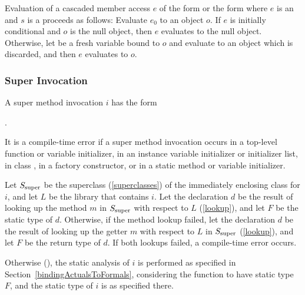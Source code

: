 \documentclass[makeidx]{article}
\begin{document}
{\LMHash{}%
Evaluation of a cascaded member access $e$
of the form  or the form 
where $e$ is an  and
$s$ is a 
proceeds as follows:
Evaluate $e_0$ to an object $o$.
If $e$ is initially conditional and $o$ is the null object,
then $e$ evaluates to the null object.
Otherwise, let  be a fresh variable bound to $o$ and
evaluate  to an object which is discarded, and
then $e$ evaluates to $o$.


\subsubsection{Super Invocation}


\LMHash{}%
A super method invocation $i$ has the form

.


\LMHash{}%
It is a compile-time error if a super method invocation occurs in a top-level function or variable initializer,
in an instance variable initializer or initializer list,
in class ,
in a factory constructor,
or in a static method or variable initializer.

{ %

\def\SuperClass{\ensuremath{S_{\mbox{\scriptsize{}super}}}}

\LMHash{}%
Let \SuperClass{} be the superclass (\ref{superclasses})
of the immediately enclosing class for $i$,
and let $L$ be the library that contains $i$.
Let the declaration $d$ be
the result of looking up the method $m$ in \SuperClass{}
with respect to $L$ (\ref{lookup}),
and let $F$ be the static type of $d$.
Otherwise, if the method lookup failed,
let the declaration $d$ be the result of looking up
the getter $m$ with respect to $L$ in \SuperClass{}
(\ref{lookup}),
and let $F$ be the return type of $d$.
If both lookups failed, a compile-time error occurs.

\LMHash{}%
Otherwise (),
the static analysis of $i$ is performed as specified in Section~\ref{bindingActualsToFormals},
considering the function to have static type $F$,
and the static type of $i$ is as specified there.

}}
\end{document}
